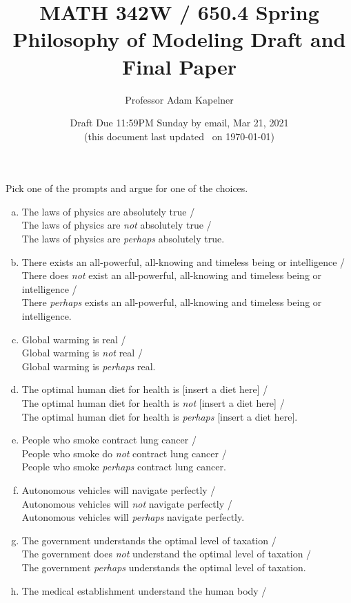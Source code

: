 \documentclass[12pt]{article}
\title{MATH 342W / 650.4 Spring \the\year \\ Philosophy of Modeling Draft and Final Paper}
\author{Professor Adam Kapelner} %
\date{Draft Due 11:59PM Sunday by email, Mar 21, 2021 \\ \vspace{0.5cm} \small (this document last updated \currenttime~on \today)}
\begin{document}
\maketitle

\noindent Pick one of the prompts and argue for one of the choices. 

\begin{enumerate}[(a)]
\item The laws of physics are absolutely true / \\
The laws of physics are \textit{not} absolutely true / \\
The laws of physics are \textit{perhaps} absolutely true.
\item There exists an all-powerful, all-knowing and timeless being or intelligence / \\
There does \textit{not} exist an all-powerful, all-knowing and timeless being or intelligence / \\
There \textit{perhaps} exists an all-powerful, all-knowing and timeless being or intelligence.
\item Global warming is real / \\
Global warming is \textit{not} real / \\
Global warming is \textit{perhaps} real.
\item The optimal human diet for health is [insert a diet here] / \\
The optimal human diet for health is \textit{not} [insert a diet here] / \\
The optimal human diet for health is \textit{perhaps} [insert a diet here].
\item People who smoke contract lung cancer / \\
People who smoke do \textit{not} contract lung cancer / \\
People who smoke \textit{perhaps} contract lung cancer.
\item Autonomous vehicles will navigate perfectly / \\
Autonomous vehicles will \textit{not} navigate perfectly / \\
Autonomous vehicles will \textit{perhaps} navigate perfectly.
\item The government understands the optimal level of taxation / \\
The government does \textit{not} understand the optimal level of taxation / \\
The government \textit{perhaps} understands the optimal level of taxation.
\item The medical establishment understand the human body / \\

\end{enumerate}
\end{document}
